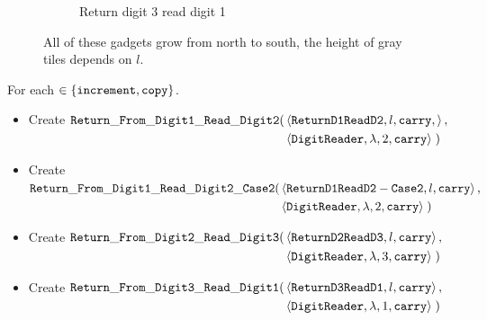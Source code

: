 \begin{figure}[H]
\begin{subfigure}[t]{0.2\textwidth}
                \caption{\label{fig:return_paths/return_digit1_read_digit2_general} Return digit 3 read digit 1}
            \end{subfigure}%
            \caption{\label{fig:return_path_same_row} All of these gadgets grow from north to south, the height of gray tiles depends on $l$.}
        \end{figure}

        \noindent For each {\inc} $\in \{ {\tt increment, copy } \}$.


        \begin{itemize}
            \item Create
            $\begin{aligned}[t]
                {\tt Return\_From\_Digit1\_Read\_Digit2}(& \left \langle {\tt ReturnD1ReadD2}, l, {\tt carry}, \right\rangle, \\
                                        & \left \langle {\tt DigitReader}, \lambda, 2, {\tt carry} \right\rangle \;)
            \end{aligned}$

            \item Create
            $\begin{aligned}[t]
                {\tt Return\_From\_Digit1\_Read\_Digit2\_Case2}(& \left \langle {\tt ReturnD1ReadD2-Case2}, l, {\tt carry} \right\rangle, \\
                                               & \left \langle {\tt DigitReader}, \lambda, 2, {\tt carry} \right\rangle \;)
            \end{aligned}$

            \item Create
            $\begin{aligned}[t]
                {\tt Return\_From\_Digit2\_Read\_Digit3}(& \left \langle {\tt ReturnD2ReadD3}, l, {\tt carry}  \right\rangle, \\
                                          & \left \langle {\tt DigitReader}, \lambda, 3, {\tt carry} \right\rangle \;)
            \end{aligned}$

            \item Create
            $\begin{aligned}[t]
                 {\tt Return\_From\_Digit3\_Read\_Digit1}(& \left \langle {\tt ReturnD3ReadD1}, l, {\tt carry} \right \rangle, \\
                                           & \left \langle {\tt DigitReader}, \lambda, 1, {\tt carry} \right \rangle \;)
            \end{aligned}$

        \end{itemize}

